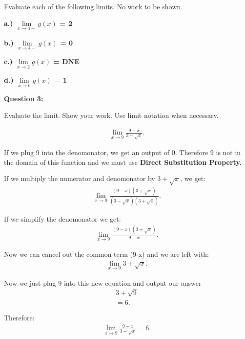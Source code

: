 \documentclass{report}
\begin{document}
    \bigbreak \noindent 
    Evaluate each of the following limits. No work to be shown.

    \bigbreak \noindent 
    \textbf{a.) $\lim\limits_{x \to 4+}{g \left(x\right)}$ = 2} 

    \bigbreak \noindent \bigbreak \noindent  
    \textbf{b.) $\lim\limits_{x \to 4-}{g \left(x\right)}$ = 0}

    \bigbreak \noindent \bigbreak \noindent 
    \textbf{c.) $\lim\limits_{x \to 2}{g \left(x\right)}$ = DNE}

    \bigbreak \noindent \bigbreak \noindent 
    \textbf{d.) $\lim\limits_{x \to 6}{g \left(x\right)}$ = 1}

    \bigbreak \noindent \bigbreak \noindent \bigbreak \noindent  
    \begin{Large}
       \textbf{Question 3:} 
    \end{Large}

    \bigbreak \noindent 
    Evaluate the limit. Show your work. Use limit notation when necessary.
    
    \begin{align*}
        \lim\limits_{x \to 9}{ \frac{9-x}{3-\sqrt{x}}}
    .\end{align*}

    \bigbreak \noindent 

    \noindent If we plug 9 into the denomonator, we get an output of 0. Therefore 9 is not in the 
    domain of this function and we must use \textbf{Direct Substitution Property.}

    \bigbreak \noindent 
    If we multiply the numerator and denomonator by $3 + \sqrt{x}$, we get:
    \begin{align*}
        \lim\limits_{x \to 9}{ \frac{ \left(9-x\right) \left(3+\sqrt{x}\right)}{ \left(3-\sqrt{x}\right) \left(3+\sqrt{x}\right)}}
    .\end{align*}

    \bigbreak \noindent 
    If we simplify the denomonator we get:
    \begin{align*}
        \lim\limits_{x \to 9}{ \frac{ \left(9-x\right) \left(3+\sqrt{x}\right)}{9-x}}
    .\end{align*}

    \bigbreak \noindent 
    Now we can cancel out the common term (9-x) and we are left with:
    \begin{align*}
        \lim\limits_{x \to 9}{3+\sqrt{x}}
    .\end{align*}

    \bigbreak \noindent 
    Now we just plug 9 into this new equation and output our answer
    \begin{align*}
        3+\sqrt{9} \\
        = 6
    .\end{align*}

    \bigbreak \noindent 
    Therefore:
    \begin{align*}
        \lim\limits_{x \to 9 }{ \frac{9-x}{3-\sqrt{x}}} = 6
    .\end{align*}
\end{document}

